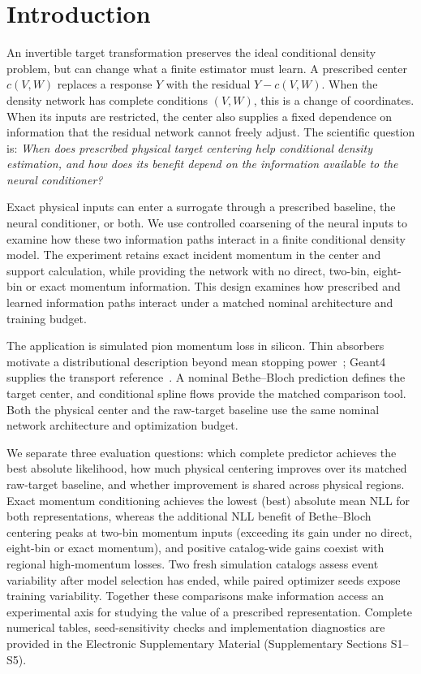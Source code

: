 \documentclass[twocolumn,epjc3]{svjour3}
\begin{document}
\section{Introduction}
\label{sec:intro}

An invertible target transformation preserves the ideal conditional density
problem, but can change what a finite estimator must learn. A prescribed
center $c(V,W)$ replaces a response $Y$ with the residual $Y-c(V,W)$.
When the density network has complete conditions $(V,W)$, this is a change of
coordinates. When its inputs are restricted, the center also supplies a fixed
dependence on information that the residual network cannot freely adjust.
The scientific question is: \emph{When does prescribed physical target centering
help conditional density estimation, and how does its benefit depend on the
information available to the neural conditioner?}

Exact physical inputs can enter a surrogate through a prescribed baseline,
the neural conditioner, or both. We use controlled coarsening of the neural
inputs to examine how these two information paths interact in a finite
conditional density model. The experiment retains exact incident momentum in
the center and support calculation, while providing the network with no direct,
two-bin, eight-bin or exact momentum information. This design examines how
prescribed and learned information paths interact under a matched nominal
architecture and training budget.

The application is simulated pion momentum loss in silicon. Thin absorbers
motivate a distributional description beyond mean stopping
power~\cite{Bichsel1988,PDG2025}; Geant4 supplies the transport
reference~\cite{Agostinelli2003,Allison2006,Allison2016}. A nominal Bethe--Bloch prediction defines
the target center, and conditional spline flows provide the matched
comparison tool. Both the physical center and the raw-target baseline use
the same nominal network architecture and optimization budget.

We separate three evaluation questions: which complete predictor achieves the
best absolute likelihood, how much physical centering improves over its
matched raw-target baseline, and whether improvement is shared across physical
regions. Exact momentum conditioning achieves the lowest (best) absolute mean
NLL for both representations, whereas the additional NLL benefit of
Bethe--Bloch centering peaks at two-bin momentum inputs (exceeding its gain
under no direct, eight-bin or exact momentum), and positive catalog-wide gains
coexist with regional high-momentum losses.
Two fresh simulation catalogs assess event variability after model selection
has ended, while paired optimizer seeds expose training variability. Together
these comparisons make information access an experimental axis for studying
the value of a prescribed representation. Complete numerical tables,
seed-sensitivity checks and implementation diagnostics are provided in the
Electronic Supplementary Material (Supplementary Sections S1--S5).
\end{document}

